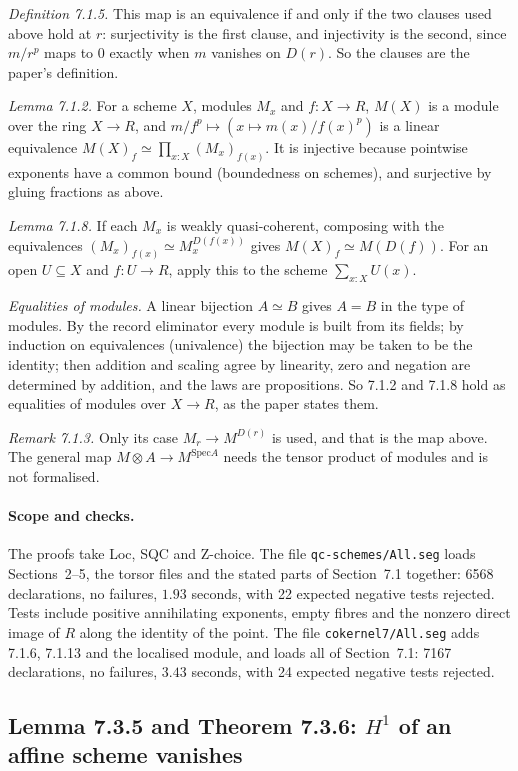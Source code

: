 \documentclass[11pt]{article}
\newcommand{\kw}[1]{\texttt{#1}}
\newcommand{\Spec}{\mathrm{Spec}}
\theoremstyle{remark}
\begin{document}
\emph{Definition 7.1.5.} This map is an equivalence if and only if the
two clauses used above hold at $r$: surjectivity is the first clause,
and injectivity is the second, since $m/r^p$ maps to $0$ exactly when
$m$ vanishes on $D(r)$. So the clauses are the paper's definition.

\emph{Lemma 7.1.2.} For a scheme $X$, modules $M_x$ and $f:X\to R$,
$M(X)$ is a module over the ring $X\to R$, and
$m/f^p\mapsto(x\mapsto m(x)/f(x)^p)$ is a linear equivalence
$M(X)_f\simeq\prod_{x:X}(M_x)_{f(x)}$. It is injective because pointwise
exponents have a common bound (boundedness on schemes), and surjective
by gluing fractions as above.

\emph{Lemma 7.1.8.} If each $M_x$ is weakly quasi-coherent,
composing with the equivalences $(M_x)_{f(x)}\simeq M_x^{D(f(x))}$ gives
$M(X)_f\simeq M(D(f))$. For an open $U\subseteq X$ and $f:U\to R$, apply
this to the scheme $\sum_{x:X}U(x)$.

\emph{Equalities of modules.} A linear bijection $A\simeq B$ gives $A=B$
in the type of modules. By the record eliminator every module is built
from its fields; by induction on equivalences (univalence) the bijection
may be taken to be the identity; then addition and scaling agree by
linearity, zero and negation are determined by addition, and the laws
are propositions. So 7.1.2 and 7.1.8 hold as equalities of modules over
$X\to R$, as the paper states them.

\emph{Remark 7.1.3.} Only its case $M_r\to M^{D(r)}$ is used, and that is
the map above. The general map $M\otimes A\to M^{\Spec A}$ needs the
tensor product of modules and is not formalised.

\paragraph{Scope and checks.} The proofs take Loc, SQC and Z-choice.
The file \kw{qc-schemes/All.seg} loads Sections~2--5, the torsor
files and the stated parts of Section~7.1 together: 6568 declarations,
no failures, $1.93$ seconds, with 22 expected negative tests rejected.
Tests include positive annihilating exponents, empty fibres and the
nonzero direct image of $R$ along the identity of the point.
The file \kw{cokernel7/All.seg} adds 7.1.6, 7.1.13 and the localised
module, and loads all of Section~7.1: 7167 declarations, no failures,
$3.43$ seconds, with 24 expected negative tests rejected.

\subsection*{Lemma 7.3.5 and Theorem 7.3.6: $H^1$ of an affine scheme vanishes}
\end{document}
